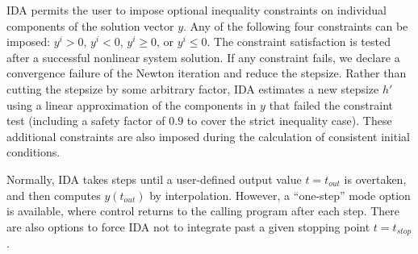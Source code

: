 IDA permits the user to impose optional inequality constraints on individual 
components of the solution vector $y$. Any of the following four constraints 
can be imposed: $y^i > 0$, $y^i < 0$, $y^i \geq 0$, or $y^i \leq 0$. 
The constraint satisfaction is tested after a successful nonlinear system solution. 
If any constraint fails, we declare a convergence failure of the Newton iteration 
and reduce the stepsize. Rather than cutting the stepsize by some arbitrary factor, 
IDA estimates a new stepsize $h'$ using a linear approximation of the components 
in $y$ that failed the constraint test (including a safety factor of $0.9$ to 
cover the strict inequality case). These additional constraints are also imposed
during the calculation of consistent initial conditions.

Normally, IDA takes steps until a user-defined output value $t = t_{out}$
is overtaken, and then computes $y(t_{out})$ by interpolation.  However,
a ``one-step'' mode option is available, where control returns to the
calling program after each step.  There are also options to force IDA
not to integrate past a given stopping point $t = t_{stop}$.

